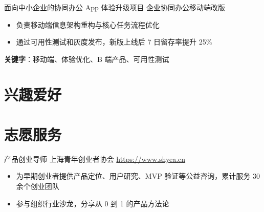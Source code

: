 \documentclass[a4paper, serif, 10pt]{moderncv}
\begin{document}
        {面向中小企业的协同办公 App 体验升级项目}
        {企业协同办公移动端改版}
        {}
        {}
        {\begin{itemize}
\item 负责移动端信息架构重构与核心任务流程优化
\item 通过可用性测试和灰度发布，新版上线后 7 日留存率提升 25\%
\end{itemize}
\textbf{关键字}：移动端、体验优化、B 端产品、可用性测试}
\section{兴趣爱好}

\section{志愿服务}

        {产品创业导师}
        {上海青年创业者协会}
        {\url{https://www.shyea.cn}}
        {}
        {\begin{itemize}
\item 为早期创业者提供产品定位、用户研究、MVP 验证等公益咨询，累计服务 30 余个创业团队
\item 参与组织行业沙龙，分享从 0 到 1 的产品方法论
\end{itemize}}
\end{document}
